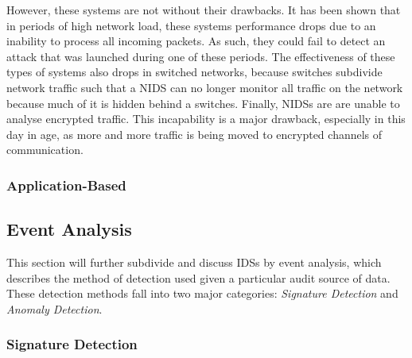 \documentclass{acm_proc_article-sp}
\begin{document}
    		However, these systems are not without their drawbacks. It has been shown that in periods of high network load, these systems performance drops due to an inability to process all incoming packets. As such, they could fail to detect an attack that was launched during one of these periods. The effectiveness of these types of systems also drops in switched networks, because switches subdivide network traffic such that a NIDS can no longer monitor all traffic on the network because much of it is hidden behind a switches. Finally, NIDSs are are unable to analyse encrypted traffic. This incapability is a major drawback, especially in this day in age, as more and more traffic is being moved to encrypted channels of communication. 		
    	\subsubsection{Application-Based}
    \subsection{Event Analysis}
    	This section will further subdivide and discuss IDSs by event analysis, which describes the method of detection used given a particular audit source of data. These detection methods fall into two major categories: \emph{Signature Detection} and \emph{Anomaly Detection}.   
	    \subsubsection{Signature Detection}
\end{document}
